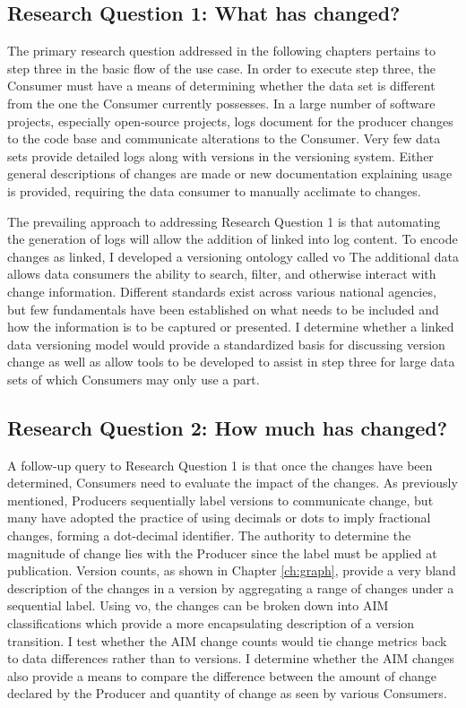 \subsection{Research Question 1: What has changed?}

The primary research question addressed in the following chapters pertains to step three in the basic flow of the use case.
In order to execute step three, the Consumer must have a means of determining whether the data set is different from the one the Consumer currently possesses.
In a large number of software projects, especially open-source projects, \glspl{log} document for the producer changes to the code base and communicate alterations to the Consumer.
Very few data sets provide detailed \glspl{log} along with \glspl{version} in the versioning system.
Either general descriptions of changes are made or new documentation explaining usage is provided, requiring the data consumer to manually acclimate to changes.

The prevailing approach to addressing Research Question 1 is that automating the generation of \glspl{log} will allow the addition of \gls{linked} into \gls{log} content.
To encode changes as \gls{linked}, I developed a versioning ontology called \gls{vo}
The additional data allows data consumers the ability to search, filter, and otherwise interact with change information.
Different standards exist across various national agencies, but few fundamentals have been established on what needs to be included and how the information is to be captured or presented.
I determine whether a linked data versioning model would provide a standardized basis for discussing version change as well as allow tools to be developed to assist in step three for large data sets of which Consumers may only use a part.

\subsection{Research Question 2: How much has changed?}

A follow-up query to Research Question 1 is that once the changes have been determined, Consumers need to evaluate the impact of the changes.
As previously mentioned, Producers sequentially label \glspl{version} to communicate change, but many have adopted the practice of using decimals or dots to imply fractional changes, forming a dot-decimal identifier.
The authority to determine the magnitude of change lies with the Producer since the label must be applied at publication.
Version counts, as shown in Chapter \ref{ch:graph}, provide a very bland description of the changes in a version by aggregating a range of changes under a sequential label.
Using \gls{vo}, the changes can be broken down into \gls{AIM} classifications which provide a more encapsulating description of a version transition.
I test whether the AIM change counts would tie change metrics back to data differences rather than to versions.
I determine whether the AIM changes also provide a means to compare the difference between the amount of change declared by the Producer and quantity of change as seen by various Consumers.

